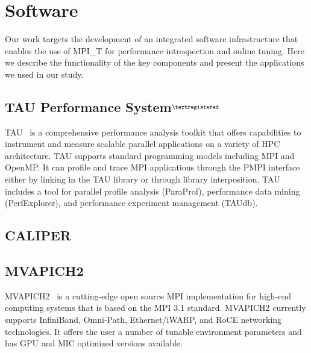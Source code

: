 \section {Software}
Our work targets the development of an integrated software infrastructure that enables the use of MPI\_T for performance introspection and online tuning. Here we describe the functionality of the key components and present the applications we used in our study.
\subsection{TAU Performance System$^{\textregistered}$}
TAU~\cite{Shende:2006:TPP:1125980.1125982} is a comprehensive performance analysis toolkit that offers capabilities to instrument and measure scalable parallel applications on a variety of HPC architecture.
TAU supports standard programming models including MPI and OpenMP. It can profile and trace MPI applications through the PMPI interface either by linking in the TAU library or through library interposition.
TAU includes a tool for parallel profile analysis (ParaProf), performance data mining (PerfExplorer), and performance experiment management (TAUdb).
\subsection {CALIPER}

\subsection{MVAPICH2}
MVAPICH2~\cite{MVAPICH2} is a cutting-edge open source MPI implementation for high-end computing systems that is based on the MPI 3.1 standard. MVAPICH2 currently supports InfiniBand, Omni-Path, Ethernet/iWARP, and RoCE networking technologies. It offers the user a number of tunable environment parameters and has GPU and MIC optimized versions available.
